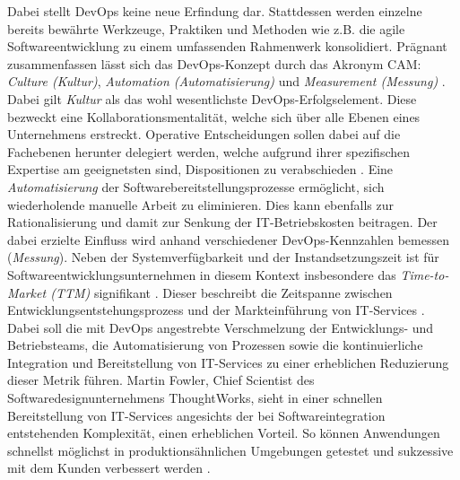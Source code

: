 Dabei stellt DevOps keine neue Erfindung dar. Stattdessen werden einzelne bereits bewährte Werkzeuge, Praktiken und Methoden wie z.B. die agile Softwareentwicklung zu einem umfassenden Rahmenwerk konsolidiert. Prägnant zusammenfassen lässt sich das DevOps-Konzept durch das Akronym CAM: \textit{Culture (Kultur)}, \textit{Automation (Automatisierung)} und \textit{Measurement (Messung)} \cite[5]{Halstenberg.2020}. Dabei gilt \textit{Kultur} als das wohl wesentlichste DevOps-Erfolgselement. Diese bezweckt eine Kollaborationsmentalität, welche sich über alle Ebenen eines Unternehmens erstreckt. Operative Entscheidungen sollen dabei auf die Fachebenen herunter delegiert werden, welche aufgrund ihrer spezifischen Expertise am geeignetsten sind, Dispositionen zu verabschieden \cite[5]{Halstenberg.2020}. Eine \textit{Automatisierung} der Softwarebereitstellungsprozesse ermöglicht, sich wiederholende manuelle Arbeit zu eliminieren. Dies kann ebenfalls zur Rationalisierung und damit zur Senkung der IT-Betriebskosten beitragen. Der dabei erzielte Einfluss wird anhand verschiedener DevOps-Kennzahlen bemessen (\textit{Messung}). Neben der Systemverfügbarkeit und der Instandsetzungszeit ist für Softwareentwicklungsunternehmen in diesem Kontext insbesondere das \textit{Time-to-Market (\acs{TTM})} signifikant \cite[7]{Halstenberg.2020}. Dieser beschreibt die Zeitspanne zwischen Entwicklungsentstehungsprozess und der Markteinführung von IT-Services \cite[141]{Vesey.1992}. Dabei soll die mit DevOps angestrebte Verschmelzung der Entwicklungs- und Betriebsteams, die Automatisierung von Prozessen sowie die kontinuierliche Integration und Bereitstellung von IT-Services zu einer erheblichen Reduzierung dieser Metrik führen. Martin Fowler, Chief Scientist des Softwaredesignunternehmens ThoughtWorks, sieht in einer schnellen Bereitstellung von IT-Services angesichts der bei Softwareintegration entstehenden Komplexität, einen erheblichen Vorteil. So können Anwendungen schnellst möglichst in produktionsähnlichen Umgebungen getestet und sukzessive mit dem Kunden verbessert werden \cite{.20230407}. 

